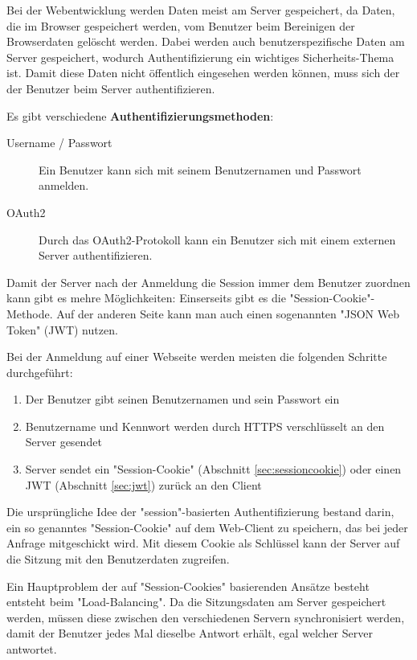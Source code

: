 

Bei der Webentwicklung werden Daten meist am Server gespeichert, da Daten, die im Browser gespeichert werden, vom Benutzer beim Bereinigen der Browserdaten gelöscht werden. Dabei werden auch benutzerspezifische Daten am Server gespeichert, wodurch Authentifizierung ein wichtiges Sicherheits-Thema ist.
Damit diese Daten nicht öffentlich eingesehen werden können, muss sich der der Benutzer beim Server authentifizieren.

Es gibt verschiedene \textbf{Authentifizierungsmethoden}:
\begin{description}
    \item[Username / Passwort] Ein Benutzer kann sich mit seinem Benutzernamen und Passwort anmelden.
    \item[OAuth2] Durch das OAuth2-Protokoll kann ein Benutzer sich mit einem externen Server authentifizieren. \cite{OAuth2}
\end{description}

Damit der Server nach der Anmeldung die Session immer dem Benutzer zuordnen kann gibt es mehre Möglichkeiten:
Einserseits gibt es die "Session-Cookie"-Methode. Auf der anderen Seite kann man auch einen sogenannten "JSON Web Token" (JWT) nutzen.

Bei der Anmeldung auf einer Webseite werden meisten die folgenden Schritte durchgeführt:
\begin{enumerate}
    \item Der Benutzer gibt seinen Benutzernamen und sein Passwort ein
    \item Benutzername und Kennwort werden durch HTTPS verschlüsselt an den Server gesendet
    \item Server sendet ein "Session-Cookie" (Abschnitt \ref{sec:sessioncookie}) oder einen JWT (Abschnitt \ref{sec:jwt}) zurück an den Client
\end{enumerate}

\pagebreak
{}\label{sec:sessioncookie}

Die ursprüngliche Idee der "session"-basierten Authentifizierung bestand darin, ein so genanntes "Session-Cookie" auf dem Web-Client zu speichern, das bei jeder Anfrage mitgeschickt wird. Mit diesem Cookie als Schlüssel kann der Server auf die Sitzung mit den Benutzerdaten zugreifen. 

Ein Hauptproblem der auf "Session-Cookies" basierenden Ansätze besteht entsteht beim "Load-Balancing". 
Da die Sitzungsdaten am Server gespeichert werden, müssen diese zwischen den verschiedenen Servern synchronisiert werden, damit der Benutzer jedes Mal dieselbe Antwort erhält, egal welcher Server antwortet. 

